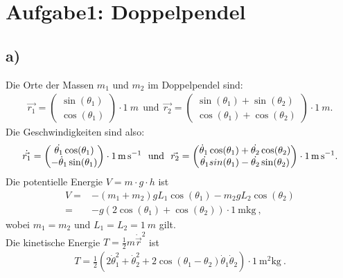 
\section*{Aufgabe1: Doppelpendel}
\subsection*{a)}
Die Orte der Massen $m_1$ und $m_2$ im Doppelpendel sind:
\begin{align}
\vec{r_1}=\begin{pmatrix}\sin(\theta_1)\\\cos(\theta_1)\end{pmatrix}
\cdot\SI{1}{m}~~\text{und}~~
\vec{r_2}=\begin{pmatrix}\sin(\theta_1)+\sin(\theta_2)\\\cos(\theta_1)+\cos(\theta_2)\end{pmatrix}\cdot\SI{1}{m}.
\end{align}
Die Geschwindigkeiten sind also:
\begin{align}
\dot{\vec{r_1}}=\begin{pmatrix}\dot{\theta_1}\cos(\theta_1)\\-\dot\theta_1\sin(\theta_1)\end{pmatrix}\cdot\SI{1}{\meter\per\second}
~~\text{und}~~
\vec{r_2}=\begin{pmatrix}\dot\theta_1\cos(\theta_1)+\dot{\theta_2}\cos(\theta_2)\\\-\dot{\theta_1}sin(\theta_1)-\dot{\theta_2}\sin(\theta_2)\end{pmatrix}\cdot\SI{1}{\meter\per\second}.
\end{align}
Die potentielle Energie $V=m\cdot g\cdot h$ ist
\begin{align}
V=&-(m_1+m_2)gL_1\cos(\theta_1)-m_2gL_2\cos(\theta_2)\\
=&-g(2\cos(\theta_1)+\cos(\theta_2))\cdot\SI{1}{\meter\kilogram}~,
\end{align}
wobei $m_1=m_2$ und $L_1=L_2=\SI{1}{m}$ gilt.\\
Die kinetische Energie $T=\frac{1}{2}m{\dot{\vec{r}}}^2$ ist
\begin{align}
T=\frac{1}{2}\left(2\dot\theta_1^2+\dot\theta_2^2+2\cos(\theta_1-\theta_2)\dot\theta_1\dot\theta_2\right)\cdot\SI{1}{\square\meter\kilogram}~.
\end{align}